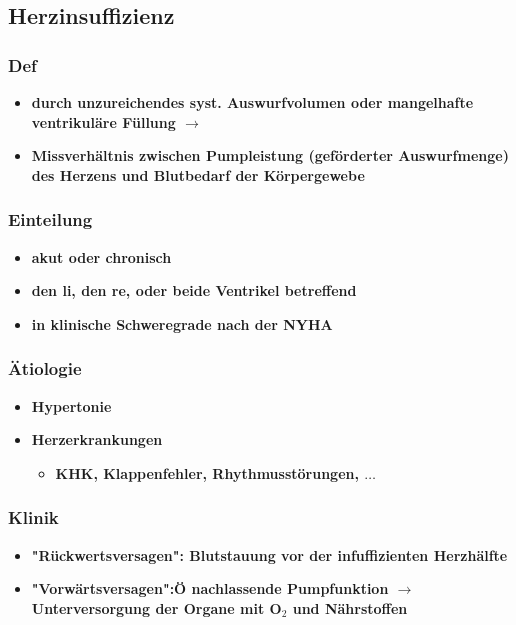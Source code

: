 	\subsection*{Herzinsuffizienz}
		\subsubsection*{Def}
			\begin{itemize}
				\item \textbf{durch unzureichendes syst. Auswurfvolumen oder mangelhafte ventrikuläre Füllung $\rightarrow$}
				\item \textbf{Missverhältnis zwischen Pumpleistung (geförderter Auswurfmenge) des Herzens und Blutbedarf der Körpergewebe}
			\end{itemize}
		\subsubsection*{Einteilung}
			\begin{itemize}
				\item \textbf{akut oder chronisch}
				\item \textbf{den li, den re, oder beide Ventrikel betreffend}
				\item \textbf{in klinische Schweregrade nach der NYHA}
			\end{itemize}
		\subsubsection*{Ätiologie}
			\begin{itemize}
				\item \textbf{Hypertonie}
				\item \textbf{Herzerkrankungen}
					\begin{itemize}
						\item \textbf{KHK, Klappenfehler, Rhythmusstörungen, $\dots$}
					\end{itemize}
			\end{itemize}
		\subsubsection*{Klinik}
			\begin{itemize}
				\item \textbf{"Rückwertsversagen": Blutstauung vor der infuffizienten Herzhälfte}
				\item \textbf{"Vorwärtsversagen":Ö nachlassende Pumpfunktion $\rightarrow$ Unterversorgung der Organe mit O$_2$ und Nährstoffen}
			\end{itemize}
